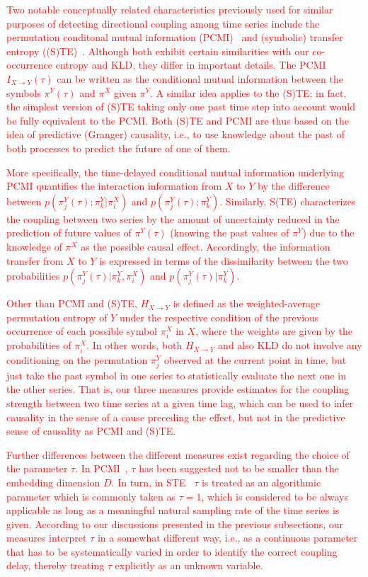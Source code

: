 \documentclass[12pt,aip,cha,reprint,nofootinbib]{revtex4-1}
\begin{document}
\textcolor{red}{Two notable conceptually related characteristics previously used for similar purposes of detecting directional coupling among time series include the permutation conditonal mutual information (PCMI)~\cite{LiNI2010} and (symbolic) transfer entropy ((S)TE)~\cite{schreiber_prl2000,Staniek2008}. Although both exhibit certain similarities with our co-occurrence entropy and KLD, they differ in important details. The PCMI $I_{X\to Y}(\tau)$ can be written as the conditional mutual information between the symbols $\pi^Y(\tau)$ and $\pi^X$ given $\pi^Y$. A similar idea applies to the (S)TE; in fact, the simplest version of (S)TE taking only one past time step into account would be fully equivalent to the PCMI. Both (S)TE and PCMI are thus based on the idea of predictive (Granger) causality, i.e., to use knowledge about the past of both processes to predict the future of one of them.}

\textcolor{red}{More specifically, the time-delayed conditional mutual information underlying PCMI quantifies the interaction information from $X$ to $Y$ by the difference between $p(\pi_j^{Y}(\tau); \pi_k^{Y} | \pi_i^{X})$  and $p(\pi_j^{Y}(\tau); \pi_k^{Y})$. Similarly, S(TE) characterizes the coupling between two series by the amount of uncertainty reduced in the prediction of future values of $\pi^{Y}(\tau)$ (knowing the past values of $\pi^{Y}$) due to the knowledge of $\pi^{X}$ as the possible causal effect. Accordingly, the information transfer from $X$ to $Y$ is expressed in terms of the dissimilarity between the two probabilities $p(\pi_j^{Y}(\tau) | \pi_k^{Y}, \pi_i^{X})$  and $p(\pi_j^{Y}(\tau) | \pi_k^{Y})$.}

\textcolor{red}{Other than PCMI and (S)TE, $H_{X\to Y}$ is defined as the weighted-average permutation entropy of $Y$ under the respective condition of the previous occurrence of each possible symbol $\pi_i^X$ in $X$, where the weights are given by the probabilities of $\pi_i^X$. In other words, both $H_{X\to Y}$ and also KLD do not involve any conditioning on the permutation $\pi_j^Y$ observed at the current point in time, but just take the past symbol in one series to statistically evaluate the next one in the other series. That is, our three measures provide estimates for the coupling strength between two time series at a given time lag, which can be used to infer causality in the sense of a cause preceding the effect, but not in the predictive sense of causality as PCMI and (S)TE.}

\textcolor{red}{Further differences between the different measures exist regarding the choice of the parameter $\tau$. In PCMI~\cite{LiNI2010}, $\tau$ has been suggested not to be smaller than the embedding dimension $D$. In turn, in STE~\cite{Staniek2008} $\tau$ is treated as an algorithmic parameter which is commonly taken as $\tau = 1$, which is considered to be always applicable as long as a meaningful natural sampling rate of the time series is given. According to our discussions presented in the previous subsections, our measures interpret $\tau$ in a somewhat different way, i.e., as a continuous parameter that has to be systematically varied in order to identify the correct coupling delay, thereby treating $\tau$ explicitly as an unknown variable.}
\end{document}
